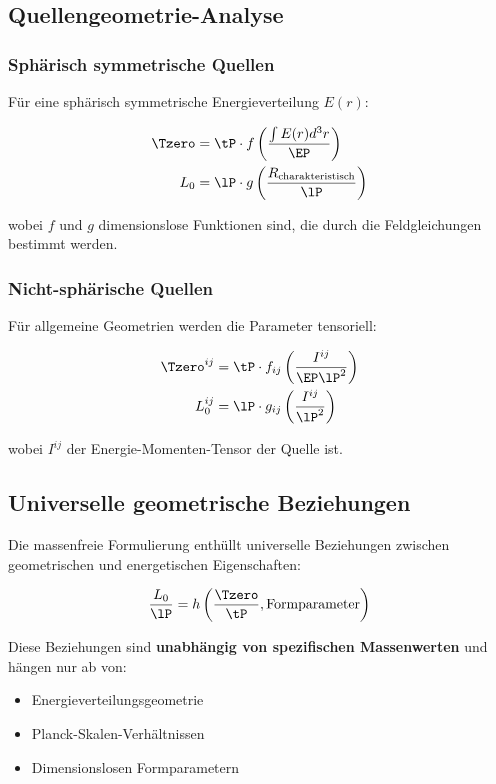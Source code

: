 	\subsection{Quellengeometrie-Analyse}
	\label{subsec:source_geometry}
	
	\subsubsection{Sphärisch symmetrische Quellen}
	
	Für eine sphärisch symmetrische Energieverteilung $E(r)$:
	
	\begin{align}
		\Tzero &= \tP \cdot f\left(\frac{\int E(r) d^3r}{\EP}\right) \\
		L_0 &= \lP \cdot g\left(\frac{R_{\text{charakteristisch}}}{\lP}\right)
	\end{align}
	
	wobei $f$ und $g$ dimensionslose Funktionen sind, die durch die Feldgleichungen bestimmt werden.
	
	\subsubsection{Nicht-sphärische Quellen}
	
	Für allgemeine Geometrien werden die Parameter tensoriell:
	
	\begin{align}
		\Tzero^{ij} &= \tP \cdot f_{ij}\left(\frac{I^{ij}}{\EP \lP^2}\right) \\
		L_0^{ij} &= \lP \cdot g_{ij}\left(\frac{I^{ij}}{\lP^2}\right)
	\end{align}
	
	wobei $I^{ij}$ der Energie-Momenten-Tensor der Quelle ist.
	
	\subsection{Universelle geometrische Beziehungen}
	\label{subsec:geometric_relations}
	
	Die massenfreie Formulierung enthüllt universelle Beziehungen zwischen geometrischen und energetischen Eigenschaften:
	
	\begin{equation}
		\frac{L_0}{\lP} = h\left(\frac{\Tzero}{\tP}, \text{Formparameter}\right)
		\label{eq:geometric_relation}
	\end{equation}
	
	Diese Beziehungen sind \textbf{unabhängig von spezifischen Massenwerten} und hängen nur ab von:
	\begin{itemize}
		\item Energieverteilungsgeometrie
		\item Planck-Skalen-Verhältnissen
		\item Dimensionslosen Formparametern
	\end{itemize}
	
